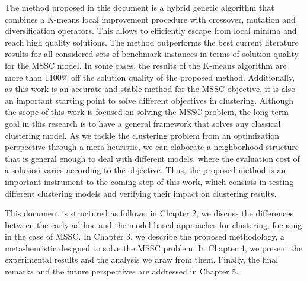 The method proposed in this document is a hybrid genetic algorithm that combines a K-means local improvement procedure with crossover, mutation and diversification operators. This allows to efficiently escape from local minima and reach high quality solutions. The method outperforms the best current literature results for all considered sets of benchmark instances in terms of solution quality for the MSSC model. In some cases, the results of the K-means algorithm are more than 1100\% off the solution quality of the proposed method. Additionally, as this work is an accurate and stable method for the MSSC objective, it is also an important starting point to solve different objectives in clustering. Although the scope of this work is focused on solving the MSSC problem, the long-term goal in this research is to have a general framework that solves any classical clustering model. As we tackle the clustering problem from an optimization perspective through a meta-heuristic, we can elaborate a neighborhood structure that is general enough to deal with different models, where the evaluation cost of a solution varies according to the objective. Thus, the proposed method is an important instrument to the coming step of this work, which consists in testing different clustering models and verifying their impact on clustering results.

This document is structured as follows: in Chapter 2, we discuss the differences between the early ad-hoc and the model-based approaches for clustering, focusing in the case of MSSC. In Chapter 3, we describe the proposed methodology, a meta-heuristic designed to solve the MSSC problem. In Chapter 4, we present the experimental results and the analysis we draw from them. Finally, the final remarks and the future perspectives are addressed in Chapter 5.